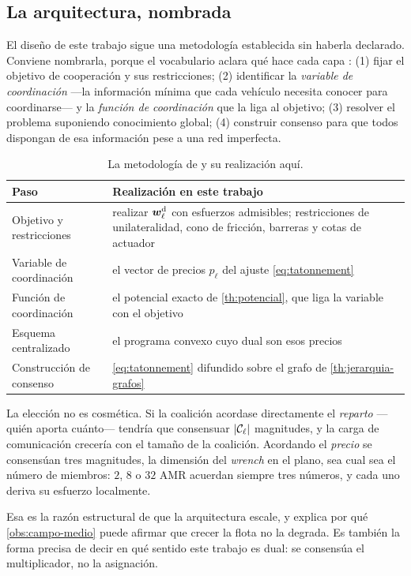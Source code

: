 \subsection{La arquitectura, nombrada}

El diseño de este trabajo sigue una metodología establecida sin haberla
declarado. Conviene nombrarla, porque el vocabulario aclara qué hace cada capa
\cite{ren2008distributed}: (1) fijar el objetivo de cooperación y sus
restricciones; (2) identificar la \emph{variable de coordinación} —la
información mínima que cada vehículo necesita conocer para coordinarse— y la
\emph{función de coordinación} que la liga al objetivo; (3) resolver el problema
suponiendo conocimiento global; (4) construir consenso para que todos dispongan
de esa información pese a una red imperfecta.

\begin{table}[!ht]
\centering\small
\caption{La metodología de \cite{ren2008distributed} y su realización aquí.}
\label{tab:metodologia}
\begin{tabularx}{\textwidth}{@{}p{3.4cm}X@{}}
\toprule
Paso & Realización en este trabajo \\
\midrule
Objetivo y restricciones
  & realizar $\bm{w}^{\mathrm{d}}_\ell$ con esfuerzos admisibles; restricciones de
    unilateralidad, cono de fricción, barreras y cotas de actuador \\
Variable de coordinación
  & el vector de precios $p_\ell$ del ajuste \eqref{eq:tatonnement} \\
Función de coordinación
  & el potencial exacto de \cref{th:potencial}, que liga la variable con el
    objetivo \\
Esquema centralizado
  & el programa convexo cuyo dual son esos precios \\
Construcción de consenso
  & \eqref{eq:tatonnement} difundido sobre el grafo de
    \cref{th:jerarquia-grafos} \\
\bottomrule
\end{tabularx}
\end{table}

\begin{observacion}
\label{obs:variable-coordinacion}
La elección no es cosmética. Si la coalición acordase directamente el
\emph{reparto} —quién aporta cuánto— tendría que consensuar $\lvert\mathcal{C}_\ell
\rvert$ magnitudes, y la carga de comunicación crecería con el tamaño de la
coalición. Acordando el \emph{precio} se consensúan tres magnitudes, la dimensión
del \emph{wrench} en el plano, sea cual sea el número de miembros: $2$, $8$ o
$32$ AMR acuerdan siempre tres números, y cada uno deriva su esfuerzo
localmente.

Esa es la razón estructural de que la arquitectura escale, y explica por qué
\cref{obs:campo-medio} puede afirmar que crecer la flota no la degrada. Es
también la forma precisa de decir en qué sentido este trabajo es dual: se
consensúa el multiplicador, no la asignación.
\end{observacion}

